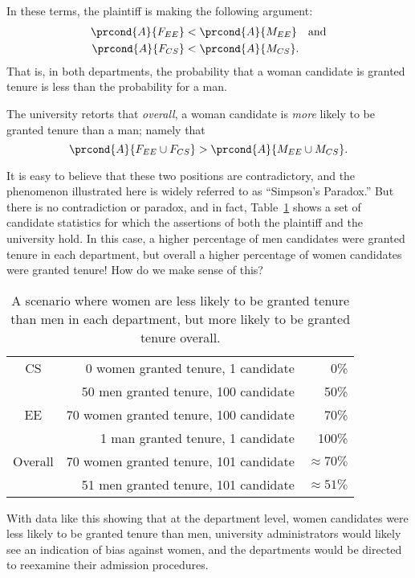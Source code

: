 In these terms, the plaintiff is making the following argument:
%
\begin{align*}
\prcond{A}{F_{EE}} & < \prcond{A}{M_{EE}} \quad\text{and}\\
\prcond{A}{F_{CS}} & < \prcond{A}{M_{CS}}.
\end{align*}
That is, in both departments, the probability that a woman candidate
is granted tenure is less than the probability for a man.

The university retorts that \emph{overall}, a woman candidate is
\emph{more} likely to be granted tenure than a man; namely that
\[
    \prcond{A}{F_{EE} \cup F_{CS}} > \prcond{A}{M_{EE} \cup M_{CS}}.
\]

It is easy to believe that these two positions are contradictory, and
the phenomenon illustrated here is widely referred to as ``Simpson's
Paradox.''  But there is no contradiction or paradox, and in fact,
Table~\ref{fig:15D3} shows a set of candidate statistics for which the
assertions of both the plaintiff and the university hold.  In this
case, a higher percentage of men candidates were granted tenure in
each department, but overall a higher percentage of women candidates
were granted tenure!  How do we make sense of this?

\begin{table}

\begin{tabular}{crr}
CS & 0 women granted tenure, 1 candidate      &   0\% \\
   & 50 men granted tenure, 100 candidate     &  50\% \\
EE & 70 women granted tenure, 100 candidate   &  70\% \\
   & 1 man granted tenure, 1 candidate         & 100\% \\
\hline
Overall & 70 women granted tenure, 101 candidate & $\approx 70\%$ \\
        & 51 men granted tenure, 101 candidate   & $\approx 51\%$
\end{tabular}

\caption{A scenario where women are less likely to be granted tenure
  than men in each department, but more likely to be granted tenure
  overall.}

\label{fig:15D3}

\end{table}

With data like this showing that at the department level, women
candidates were less likely to be granted tenure than men, university
administrators would likely see an indication of bias against women,
and the departments would be directed to reexamine their admission
procedures.

